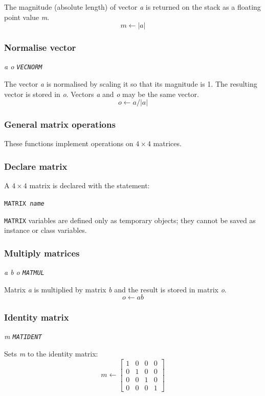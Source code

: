 \documentclass{article}
\begin{document}
The magnitude (absolute length) of vector {\em a} is returned on the
stack as a floating point value {\em m}.
\[ m \leftarrow |a| \]

\subsubsection{Normalise vector}

{\em a o {\tt VECNORM}}

The vector {\em a} is normalised by scaling it so that its magnitude
is 1.  The resulting vector is stored in {\em o}.  Vectors {\em a} and
{\em o} may be the same vector.
\[ o \leftarrow a / |a| \]

\subsubsection{General matrix operations}

These functions implement operations on $4\times 4$ matrices.

\subsubsection{Declare matrix}

A $4\times 4$ matrix is declared with the statement:

{\tt MATRIX {\em name}}

{\tt MATRIX} variables are defined only as temporary objects; they
cannot be saved as instance or class variables.

\subsubsection{Multiply matrices}

{\em a b o {\tt MATMUL}}

Matrix {\em a} is multiplied by matrix {\em b} and the result is
stored in matrix {\em o}.
\[ o \leftarrow a b \]

\subsubsection{Identity matrix}

{\em m {\tt MATIDENT}}

Sets {\em m} to the identity matrix:
\[ m \leftarrow \left[
\begin{array}{cccc}
        1 & 0 & 0 & 0 \\
        0 & 1 & 0 & 0 \\
        0 & 0 & 1 & 0 \\
        0 & 0 & 0 & 1
\end{array}
\right] \]
\end{document}
